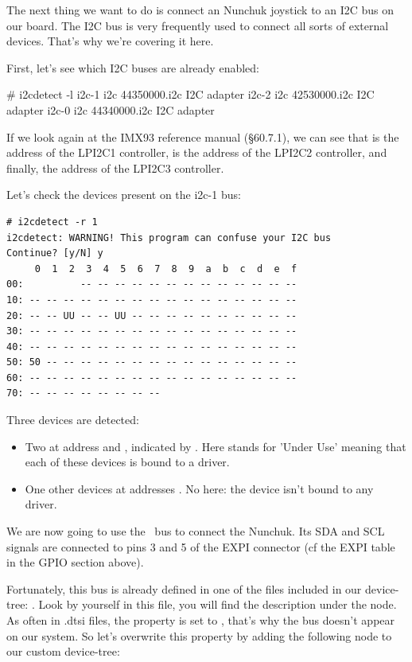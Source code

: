 The next thing we want to do is connect an Nunchuk joystick
to an I2C bus on our board. The I2C bus is very frequently used
to connect all sorts of external devices. That's why we're covering
it here.

First, let’s see which I2C buses are already enabled:
\begin{bashinput}
# i2cdetect -l
i2c-1	i2c       	44350000.i2c                    	I2C adapter
i2c-2	i2c       	42530000.i2c                    	I2C adapter
i2c-0	i2c       	44340000.i2c                    	I2C adapter
\end{bashinput}

If we look again at the IMX93 reference manual (§60.7.1), we can see that
 is the address of the LPI2C1 controller,  is
the address of the LPI2C2 controller, and finally,  the address
of the LPI2C3 controller.

Let's check the devices present on the i2c-1 bus:

\begin{verbatim}
# i2cdetect -r 1
i2cdetect: WARNING! This program can confuse your I2C bus
Continue? [y/N] y
     0  1  2  3  4  5  6  7  8  9  a  b  c  d  e  f
00:          -- -- -- -- -- -- -- -- -- -- -- -- -- 
10: -- -- -- -- -- -- -- -- -- -- -- -- -- -- -- -- 
20: -- -- UU -- -- UU -- -- -- -- -- -- -- -- -- -- 
30: -- -- -- -- -- -- -- -- -- -- -- -- -- -- -- -- 
40: -- -- -- -- -- -- -- -- -- -- -- -- -- -- -- -- 
50: 50 -- -- -- -- -- -- -- -- -- -- -- -- -- -- -- 
60: -- -- -- -- -- -- -- -- -- -- -- -- -- -- -- -- 
70: -- -- -- -- -- -- -- -- 
\end{verbatim}

Three devices are detected:
\begin{itemize}
\item Two at address  and , indicated by . Here
   stands for 'Under Use' meaning that each of these devices is bound
  to a driver.
\item One other devices at addresses . No  here: the device
  isn't bound to any driver.
\end{itemize}

We are now going to use the \busname\ bus to connect the Nunchuk. Its SDA and SCL
signals are connected to pins 3 and 5 of the EXPI connector (cf the EXPI table
in the GPIO section above).

Fortunately, this bus is already defined in one of the files included in our
device-tree: .
Look by yourself in this file, you will find the description under the
 node. As often in .dtsi files, the  property is set
to , that's why the bus doesn't appear on our system. So let's
overwrite this  property by adding the following node to our
custom device-tree:

